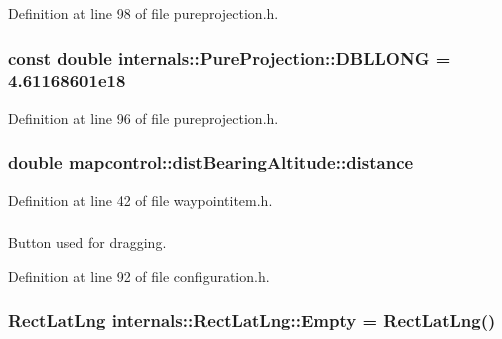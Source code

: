 \-Definition at line 98 of file pureprojection.\-h.

\hypertarget{group___o_p_map_widget_gaffa95138ab57a5c0267eb66399bbdc5c}{
\subsubsection[{\-D\-B\-L\-L\-O\-N\-G}]{\setlength{\rightskip}{0pt plus 5cm}const double {\bf internals\-::\-Pure\-Projection\-::\-D\-B\-L\-L\-O\-N\-G} = 4.\-61168601e18}}\label{group___o_p_map_widget_gaffa95138ab57a5c0267eb66399bbdc5c}


\-Definition at line 96 of file pureprojection.\-h.

\hypertarget{group___o_p_map_widget_ga4f3ed7668339c6c63a158fe42d69f8ee}{
\subsubsection[{distance}]{\setlength{\rightskip}{0pt plus 5cm}double {\bf mapcontrol\-::dist\-Bearing\-Altitude\-::distance}}}\label{group___o_p_map_widget_ga4f3ed7668339c6c63a158fe42d69f8ee}


\-Definition at line 42 of file waypointitem.\-h.

\hypertarget{group___o_p_map_widget_ga18190e2acae7a12ba6b598cf25244acf}{
\subsubsection[{\-Drag\-Button}]{}}\label{group___o_p_map_widget_ga18190e2acae7a12ba6b598cf25244acf}


\-Button used for dragging. 



\-Definition at line 92 of file configuration.\-h.

\hypertarget{group___o_p_map_widget_ga0975dcf29ee445b5510f2c502940b50a}{
\subsubsection[{\-Empty}]{\setlength{\rightskip}{0pt plus 5cm}\-Rect\-Lat\-Lng {\bf internals\-::\-Rect\-Lat\-Lng\-::\-Empty} = \-Rect\-Lat\-Lng()}}\label{group___o_p_map_widget_ga0975dcf29ee445b5510f2c502940b50a}


